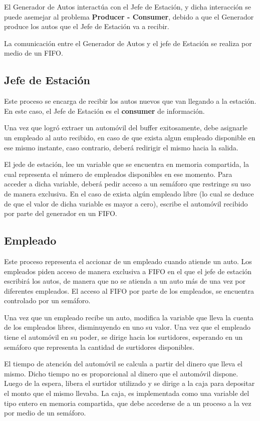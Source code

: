 \documentclass[12pt,a4paper,spanish]{article}
\begin{document}
		El Generador de Autos interactúa con el Jefe de Estación, y dicha interacción se puede
		asemejar al problema \textbf{Producer - Consumer}, debido a que el Generador produce
		los autos que el Jefe de Estación va a recibir. 

		La comunicación entre el Generador de Autos y el jefe de Estación se realiza por medio de un
		FIFO.


	\subsection{Jefe de Estación}
		Este proceso se encarga de recibir los autos nuevos que van llegando a la estación. 
		En este caso, el Jefe de Estación es el \textbf{consumer} de información.

		Una vez que logró extraer un automóvil del buffer exitosamente, debe asignarle 
		un empleado al auto recibido, en caso de que exista algun empleado disponible 
		en ese mismo instante, caso contrario, deberá redirigir el mismo hacia la salida.
		
		El jede de estación, lee un variable que se encuentra en memoria compartida, la cual
		representa el número de empleados disponibles en ese momento. Para acceder a dicha variable,
		deberá pedir acceso a un semáforo que restringe su uso de manera exclusiva.
		En el caso de exista algún empleado libre (lo cual se deduce de que el valor de dicha variable
		es mayor a cero), escribe el automóvil recibido por parte del generador en un FIFO.


	\subsection{Empleado}
	
		Este proceso representa el accionar de un empleado cuando atiende un auto. Los empleados piden acceso
		de manera exclusiva a FIFO en el que el jefe de estación escribirá los autos, de manera que no se
		atienda a un auto más de una vez por diferentes empleados. El acceso al FIFO por parte de los empleados,
		se encuentra controlado por un semáforo. 

		Una vez que un empleado recibe un auto, modifica la variable que lleva la cuenta de los empleados libres, 
		disminuyendo en uno su valor. Una vez que el empleado tiene el automóvil en su poder, se dirige hacia los
		surtidores, esperando en un semáforo que representa la cantidad de surtidores disponibles. 

		El tiempo de atención del automóvil se calcula a partir del dinero que lleva el mismo. Dicho tiempo no es
		proporcional al dinero que el automóvil dispone. Luego de la espera, libera el surtidor utilizado y se dirige
		a la caja para depositar el monto que el mismo llevaba. La caja, es implementada como una variable del tipo entero
		en memoria compartida, que debe accederse de a un proceso a la vez por medio de un semáforo.
\end{document}

